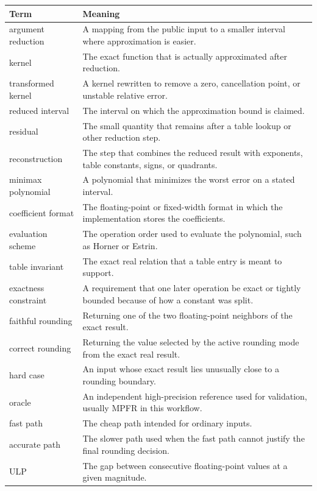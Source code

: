 \documentclass[manuscript, nonacm]{acmart}
\begin{document}
  \begin{table}[tbp]
    \centering
    \begin{tabular}{p{3.8cm}p{8.5cm}}
      \toprule
      Term & Meaning                                                           \\
      \midrule
      argument reduction
      & A mapping from the public input to a smaller interval where
      approximation is easier. \\
      kernel
      & The exact function that is actually approximated after reduction. \\
      transformed kernel
      & A kernel rewritten to remove a zero, cancellation point, or unstable
      relative error. \\
      reduced interval
      & The interval on which the approximation bound is claimed. \\
      residual
      & The small quantity that remains after a table lookup or other
      reduction step. \\
      reconstruction
      & The step that combines the reduced result with exponents, table
      constants, signs, or quadrants. \\
      minimax polynomial
      & A polynomial that minimizes the worst error on a stated interval. \\
      coefficient format
      & The floating-point or fixed-width format in which the implementation
      stores the coefficients. \\
      evaluation scheme
      & The operation order used to evaluate the polynomial, such as Horner
      or Estrin. \\
      table invariant
      & The exact real relation that a table entry is meant to support. \\
      exactness constraint
      & A requirement that one later operation be exact or tightly bounded
      because of how a constant was split. \\
      faithful rounding
      & Returning one of the two floating-point neighbors of the exact
      result. \\
      correct rounding
      & Returning the value selected by the active rounding mode from the
      exact real result. \\
      hard case
      & An input whose exact result lies unusually close to a rounding
      boundary. \\
      oracle
      & An independent high-precision reference used for validation, usually
      MPFR in this workflow. \\
      fast path
      & The cheap path intended for ordinary inputs. \\
      accurate path
      & The slower path used when the fast path cannot justify the final
      rounding decision. \\
      ULP
      & The gap between consecutive floating-point values at a given
      magnitude. \\
      \bottomrule
    \end{tabular}
  \end{table}
\end{document}

